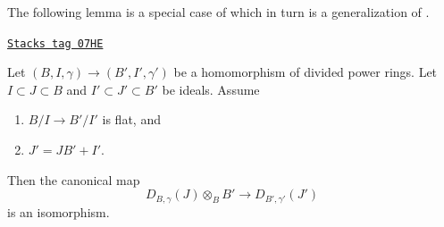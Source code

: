 The following lemma is a special case of
\cite[Proposition 2.1.7]{dJ-crystalline} which in turn is a
generalization of \cite[Proposition 2.8.2]{Berthelot}.

\begin{lemma}
\label{crystalline-lemma-flat-extension-divided-power-envelope}
\href{https://stacks.math.columbia.edu/tag/07HE}{\texttt{Stacks tag 07HE}}

Let $(B, I, \gamma) \to (B', I', \gamma')$ be a homomorphism of
divided power rings. Let $I \subset J \subset B$ and
$I' \subset J' \subset B'$ be ideals. Assume
\begin{enumerate}
\item $B/I \to B'/I'$ is flat, and
\item $J' = JB' + I'$.
\end{enumerate}
Then the canonical map
$$
D_{B, \gamma}(J) \otimes_B B' \longrightarrow D_{B', \gamma'}(J')
$$
is an isomorphism.
\end{lemma}

